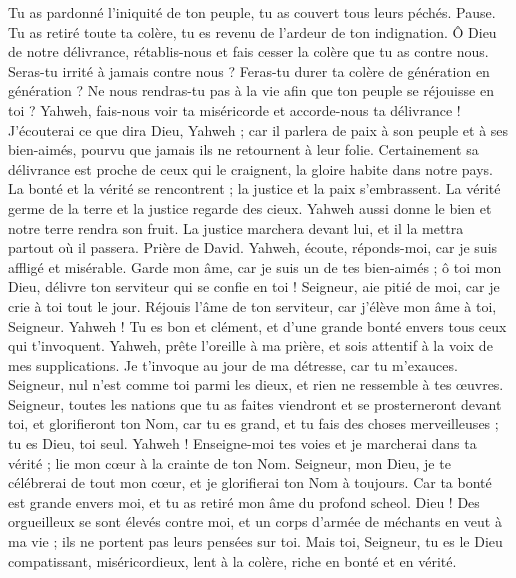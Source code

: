 \begin{multicols}{2}
Tu as pardonné l'iniquité de ton peuple, tu as couvert tous leurs péchés. Pause.
Tu as retiré toute ta colère, tu es revenu de l'ardeur de ton indignation.
Ô Dieu de notre délivrance, rétablis-nous et fais cesser la colère que tu as contre nous.
Seras-tu irrité à jamais contre nous ? Feras-tu durer ta colère de génération en génération ?
Ne nous rendras-tu pas à la vie afin que ton peuple se réjouisse en toi ?
Yahweh, fais-nous voir ta miséricorde et accorde-nous ta délivrance !
J'écouterai ce que dira Dieu, Yahweh ; car il parlera de paix à son peuple et à ses bien-aimés, pourvu que jamais ils ne retournent à leur folie.
Certainement sa délivrance est proche de ceux qui le craignent, la gloire habite dans notre pays.
La bonté et la vérité se rencontrent ; la justice et la paix s’embrassent.
La vérité germe de la terre et la justice regarde des cieux.
Yahweh aussi donne le bien et notre terre rendra son fruit.
La justice marchera devant lui, et il la mettra partout où il passera.
\VerseOne{}Prière de David. Yahweh, écoute, réponds-moi, car je suis affligé et misérable.
Garde mon âme, car je suis un de tes bien-aimés ; ô toi mon Dieu, délivre ton serviteur qui se confie en toi !
Seigneur, aie pitié de moi, car je crie à toi tout le jour.
Réjouis l'âme de ton serviteur, car j'élève mon âme à toi, Seigneur.
Yahweh ! Tu es bon et clément, et d'une grande bonté envers tous ceux qui t'invoquent.
Yahweh, prête l'oreille à ma prière, et sois attentif à la voix de mes supplications.
Je t'invoque au jour de ma détresse, car tu m'exauces.
Seigneur, nul n’est comme toi parmi les dieux, et rien ne ressemble à tes œuvres.
Seigneur, toutes les nations que tu as faites viendront et se prosterneront devant toi, et glorifieront ton Nom,
car tu es grand, et tu fais des choses merveilleuses ; tu es Dieu, toi seul.
Yahweh ! Enseigne-moi tes voies et je marcherai dans ta vérité ; lie mon cœur à la crainte de ton Nom.
Seigneur, mon Dieu, je te célébrerai de tout mon cœur, et je glorifierai ton Nom à toujours.
Car ta bonté est grande envers moi, et tu as retiré mon âme du profond scheol.
Dieu ! Des orgueilleux se sont élevés contre moi, et un corps d’armée de méchants en veut à ma vie ; ils ne portent pas leurs pensées sur toi.
Mais toi, Seigneur, tu es le Dieu compatissant, miséricordieux, lent à la colère, riche en bonté et en vérité.

\end{multicols}
